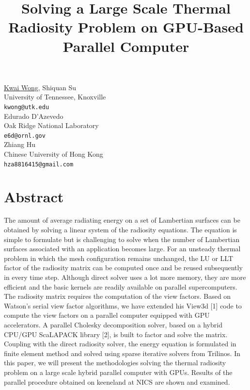 \documentclass[article, A4, 11pt]{llncs}%
\begin{document}
\title{Solving a Large Scale Thermal Radiosity Problem on GPU-Based Parallel Computer}
 \author{} \institute{}
\maketitle
\begin{center}
{\large \underline{Kwai Wong}, Shiquan  Su}\\
University of Tennessee, Knoxville\\
{\tt kwong@utk.edu}
\\ \vspace{4mm}
{\large Edurado  D'Azevedo}\\
Oak Ridge National Laboratory\\
{\tt e6d@ornl.gov}
\\ \vspace{4mm}
{\large Zhiang Hu}\\
Chinese University of Hong Kong\\
{\tt hza8816415@gmail.com}
\end{center}

\section*{Abstract}
The amount of average radiating energy on a set of Lambertian surfaces can be obtained by solving a linear system of the radiosity equations. The equation is simple to formulate but is challenging to solve when the number of Lambertian surfaces associated with an application becomes large. For an unsteady thermal problem in which the mesh configuration remains unchanged, the LU or LLT factor of the radiosity matrix can be computed once and be reused subsequently in every time step. Although direct solver uses a lot more memory, they are more efficient and the basic kernels are readily available on parallel supercomputers.
The radiosity matrix requires the computation of the view factors. Based on Watson’s serial view factor algorithms, we have extended his View3d [1] code to compute the view factors on a parallel computer equipped with GPU accelerators. A parallel Cholesky decomposition solver, based on a hybrid CPU/GPU ScaLAPACK library [2], is built to factor and solve the matrix. Coupling with the direct radiosity solver, the energy equation is formulated in finite element method and solved using sparse iterative solvers from Trilinos. In this paper, we will present the methodologies solving the thermal radiosity problem on a large scale hybrid parallel computer with GPUs. Results of the parallel procedure obtained on keeneland at NICS are shown and examined.
\end{document}
